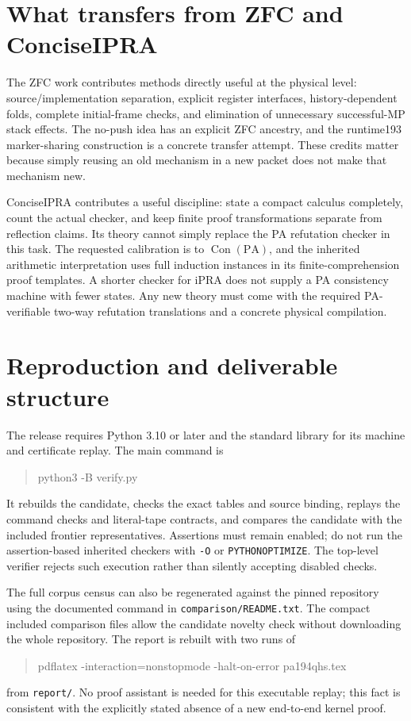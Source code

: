 \documentclass[11pt,letterpaper]{article}
\newcommand{\PA}{\mathrm{PA}}
\newcommand{\Con}{\operatorname{Con}}
\newcommand{\file}[1]{\texttt{\nolinkurl{#1}}}
\begin{document}
\section{What transfers from ZFC and ConciseIPRA}

The ZFC work contributes methods directly useful at the physical level:
source/implementation separation, explicit register interfaces,
history-dependent folds, complete initial-frame checks, and elimination
of unnecessary successful-MP stack effects. The no-push idea has an
explicit ZFC ancestry, and the runtime193 marker-sharing construction
is a concrete transfer attempt. These credits matter because simply
reusing an old mechanism in a new packet does not make that mechanism
new.

ConciseIPRA contributes a useful discipline: state a compact calculus
completely, count the actual checker, and keep finite proof transformations
separate from reflection claims. Its theory cannot simply replace the
PA refutation checker in this task. The requested calibration is to
$\Con(\PA)$, and the inherited arithmetic interpretation uses full
induction instances in its finite-comprehension proof templates. A
shorter checker for iPRA does not supply a PA consistency machine with
fewer states. Any new theory must come with the required PA-verifiable
two-way refutation translations and a concrete physical compilation.

\section{Reproduction and deliverable structure}

The release requires Python 3.10 or later and the standard library for
its machine and certificate replay. The main command is
\begin{quote}\ttfamily
python3 -B verify.py
\end{quote}
It rebuilds the candidate, checks the exact tables and source binding,
replays the command checks and literal-tape contracts, and compares the
candidate with the included frontier representatives. Assertions must
remain enabled; do not run the assertion-based inherited checkers with
\file{-O} or \file{PYTHONOPTIMIZE}. The top-level verifier rejects such
execution rather than silently accepting disabled checks.

The full corpus census can also be regenerated against the pinned
repository using the documented command in \file{comparison/README.txt}.
The compact included comparison files allow the candidate novelty check
without downloading the whole repository. The report is rebuilt with
two runs of
\begin{quote}\ttfamily
pdflatex -interaction=nonstopmode -halt-on-error pa194qhs.tex
\end{quote}
from \file{report/}. No proof assistant is needed for this executable
replay; this fact is consistent with the explicitly stated absence of a
new end-to-end kernel proof.
\end{document}

